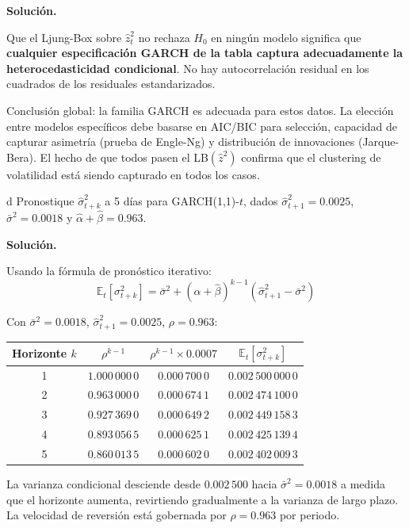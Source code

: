 \documentclass[11pt,a4paper]{article}
\newcommand{\E}{\mathbb{E}}
\newcommand{\sigmabar}{\bar{\sigma}^2}
\begin{document}
\textbf{Solución.}

Que el Ljung-Box sobre $\hat{z}_t^2$ no rechaza $H_0$ en ningún modelo significa que \textbf{cualquier especificación GARCH de la tabla captura adecuadamente la heterocedasticidad condicional}. No hay autocorrelación residual en los cuadrados de los residuales estandarizados.

Conclusión global: la familia GARCH es adecuada para estos datos. La elección entre modelos específicos debe basarse en AIC/BIC para selección, capacidad de capturar asimetría (prueba de Engle-Ng) y distribución de innovaciones (Jarque-Bera). El hecho de que todos pasen el LB$(\hat{z}^2)$ confirma que el clustering de volatilidad está siendo capturado en todos los casos.

\begin{cajaInciso}{d}
Pronostique $\hat{\sigma}^2_{t+k}$ a 5 días para GARCH(1,1)-$t$, dados $\hat{\sigma}^2_{t+1}=0.0025$, $\sigmabar=0.0018$ y $\hat{\alpha}+\hat{\beta}=0.963$.
\end{cajaInciso}

\textbf{Solución.}

Usando la fórmula de pronóstico iterativo:
\[
\E_t[\sigma^2_{t+k}] = \sigmabar + (\hat{\alpha}+\hat{\beta})^{k-1}(\hat{\sigma}^2_{t+1} - \sigmabar)
\]

Con $\sigmabar=0.0018$, $\hat{\sigma}^2_{t+1}=0.0025$, $\rho=0.963$:

\begin{center}
\begin{tabular}{@{}cccc@{}}
\toprule
Horizonte $k$ & $\rho^{k-1}$ & $\rho^{k-1}\times 0.0007$ & $\E_t[\sigma^2_{t+k}]$ \\
\midrule
1 & $1.000\,000\,0$ & $0.000\,700\,0$ & $0.002\,500\,000\,0$ \\
2 & $0.963\,000\,0$ & $0.000\,674\,1$ & $0.002\,474\,100\,0$ \\
3 & $0.927\,369\,0$ & $0.000\,649\,2$ & $0.002\,449\,158\,3$ \\
4 & $0.893\,056\,5$ & $0.000\,625\,1$ & $0.002\,425\,139\,4$ \\
5 & $0.860\,013\,5$ & $0.000\,602\,0$ & $0.002\,402\,009\,3$ \\
\bottomrule
\end{tabular}
\end{center}

La varianza condicional desciende desde $0.002\,500$ hacia $\sigmabar=0.0018$ a medida que el horizonte aumenta, revirtiendo gradualmente a la varianza de largo plazo. La velocidad de reversión está gobernada por $\rho=0.963$ por periodo.
\end{document}
